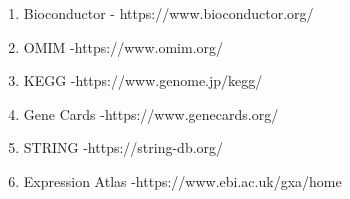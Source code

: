 \begin{enumerate}
	\item Bioconductor - https://www.bioconductor.org/
	\item OMIM -https://www.omim.org/
	\item KEGG -https://www.genome.jp/kegg/
	\item Gene Cards -https://www.genecards.org/
	\item STRING -https://string-db.org/
	\item Expression Atlas -https://www.ebi.ac.uk/gxa/home
\end{enumerate}
